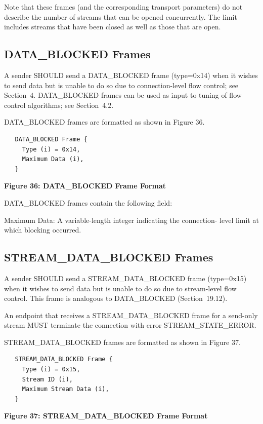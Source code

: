 \documentclass{article}
\begin{document}
Note that these frames (and the corresponding transport parameters) do not describe the number of streams that can be opened concurrently.  The limit includes streams that have been closed as well as those that are open.

\subsection{DATA\_BLOCKED Frames}

A sender SHOULD send a DATA\_BLOCKED frame (type=0x14) when it wishes to send data but is unable to do so due to connection-level flow control; see Section~4.  DATA\_BLOCKED frames can be used as input to tuning of flow control algorithms; see Section~4.2.

DATA\_BLOCKED frames are formatted as shown in Figure 36.

\begin{verbatim}
   DATA_BLOCKED Frame {
     Type (i) = 0x14,
     Maximum Data (i),
   }
\end{verbatim}

\begin{center}
\textbf{Figure 36: DATA\_BLOCKED Frame Format}
\end{center}

DATA\_BLOCKED frames contain the following field:

Maximum Data:  A variable-length integer indicating the connection- level limit at which blocking occurred.

\subsection{STREAM\_DATA\_BLOCKED Frames}

A sender SHOULD send a STREAM\_DATA\_BLOCKED frame (type=0x15) when it wishes to send data but is unable to do so due to stream-level flow control.  This frame is analogous to DATA\_BLOCKED (Section~19.12).

An endpoint that receives a STREAM\_DATA\_BLOCKED frame for a send-only stream MUST terminate the connection with error STREAM\_STATE\_ERROR.

STREAM\_DATA\_BLOCKED frames are formatted as shown in Figure 37.

\begin{verbatim}
   STREAM_DATA_BLOCKED Frame {
     Type (i) = 0x15,
     Stream ID (i),
     Maximum Stream Data (i),
   }
\end{verbatim}

\begin{center}
\textbf{Figure 37: STREAM\_DATA\_BLOCKED Frame Format}
\end{center}
\end{document}
